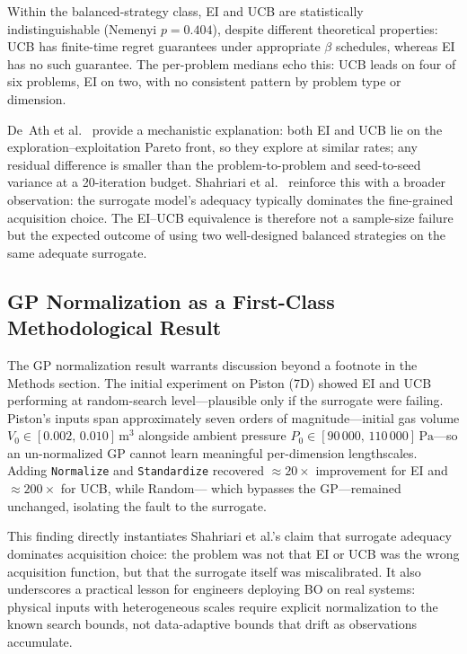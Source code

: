 Within the balanced-strategy class, EI and UCB are statistically
indistinguishable (Nemenyi $p = 0.404$), despite different theoretical
properties: UCB has finite-time regret guarantees under appropriate
$\beta$ schedules, whereas EI has no such guarantee.
The per-problem medians echo this: UCB leads on four of six problems, EI
on two, with no consistent pattern by problem type or dimension.

De~Ath et al.~\citeyear{deAth2019greed} provide a mechanistic
explanation: both EI and UCB lie on the exploration–exploitation Pareto
front, so they explore at similar rates; any residual difference is
smaller than the problem-to-problem and seed-to-seed variance at a
20-iteration budget.
Shahriari et al.~\citeyear{shahriari2016taking} reinforce this with a
broader observation: the surrogate model's adequacy typically dominates
the fine-grained acquisition choice.
The EI–UCB equivalence is therefore not a sample-size failure but the
expected outcome of using two well-designed balanced strategies on the
same adequate surrogate.

\subsection{GP Normalization as a First-Class Methodological Result}
\label{sec:normalization}

The GP normalization result warrants discussion beyond a footnote in the
Methods section.
The initial experiment on Piston (7D) showed EI and UCB performing at
random-search level—plausible only if the surrogate were failing.
Piston's inputs span approximately seven orders of magnitude—initial gas
volume $V_0 \in [0.002,\,0.010]\,\mathrm{m}^3$ alongside ambient
pressure $P_0 \in [90\,000,\,110\,000]\,\mathrm{Pa}$—so an
un-normalized GP cannot learn meaningful per-dimension lengthscales.
Adding \texttt{Normalize} and \texttt{Standardize} recovered ${\approx}20\times$
improvement for EI and ${\approx}200\times$ for UCB, while Random—
which bypasses the GP—remained unchanged, isolating the fault to the
surrogate.

This finding directly instantiates Shahriari et al.'s
\citeyear{shahriari2016taking} claim that surrogate adequacy dominates
acquisition choice: the problem was not that EI or UCB was the wrong
acquisition function, but that the surrogate itself was miscalibrated.
It also underscores a practical lesson for engineers deploying BO on
real systems: physical inputs with heterogeneous scales require explicit
normalization to the known search bounds, not data-adaptive bounds that
drift as observations accumulate.


